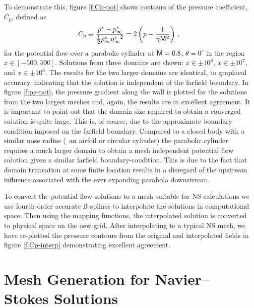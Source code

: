 To demonstrate this, figure \ref{f:Cp-pot} shows contours of the pressure
coefficient, $C_p$, defined as
%
\begin{equation} \label{e:Cp}
  C_p \equiv \frac{p^* - p_\infty^*}{\frac{1}{2}\rho_\infty^* {u_\infty^*}^2} =
             2 \left( p - \frac{1}{\gamma {\sf M}^2} \right) {\, ,}  
\end{equation}
%
for the potential flow over a parabolic cylinder at ${\sf M}=0.8$, $\theta=0^\circ$
in the region $x \in [-500,500]$.  Solutions from three domains are shown: $x
\in \pm 10^8$, $x \in \pm 10^7$, and $x \in \pm 10^6$.  The results for the
two larger domains are identical, to graphical accuracy, indicating that the
solution is independent of the farfield boundary.  In figure \ref{f:pg-pot},
the pressure gradient along the wall is plotted for the solutions from the two
largest meshes and, again, the results are in excellent agreement.  It is
important to point out that the domain size required to obtain a converged
solution is quite large.  This is, of course, due to the approximate
boundary-condition imposed on the farfield boundary.  Compared to a closed
body with a similar nose radius (\eg\ an airfoil or circular cylinder) the
parabolic cylinder requires a much larger domain to obtain a mesh independent
potential flow solution given a similar farfield boundary-condition.  This is
due to the fact that domain truncation at some finite location results in a
disregard of the upstream influence associated with the ever expanding
parabola downstream.

To convert the potential flow solutions to a mesh suitable for NS calculations
we use fourth-order accurate B-splines \cite{IMSL:91} to interpolate the
solutions in computational space.  Then using the mapping functions, the
interpolated solution is converted to physical space on the new grid.  After
interpolating to a typical NS mesh, we have re-plotted the pressure contours
from the original and interpolated fields in figure \ref{f:Cp-interp}
demonstrating excellent agreement.

%
%
\section{Mesh Generation for Navier--Stokes Solutions \label{s:meshmap} }

